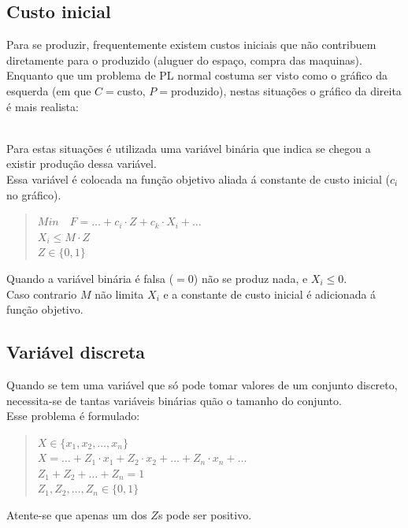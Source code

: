 \documentclass[]{report}
\begin{document}
\subsection{Custo inicial}
Para se produzir, frequentemente existem custos iniciais que não contribuem diretamente para o produzido (aluguer do espaço, compra das maquinas).\\
Enquanto que um problema de PL normal costuma ser visto como o gráfico da esquerda (em que $C=$custo, $P=$produzido), nestas situações o gráfico da direita é mais realista:\\
\\
Para estas situações é utilizada uma variável binária que indica se chegou a existir produção dessa variável.\\
Essa variável é colocada na função objetivo aliada á constante de custo inicial ($c_i$ no gráfico).
\begin{quotation}
\noindent $Min\quad F= \dots + c_i \cdot Z + c_k \cdot X_i + \dots$\\
$X_i \leq M \cdot Z$\\
$Z \in \{0,1\}$
\end{quotation}
Quando a variável binária é falsa ($=0$) não se produz nada, e $X_i \leq 0$.\\
Caso contrario $M$ não limita $X_i$ e a constante de custo inicial é adicionada á função objetivo.
\subsection{Variável discreta}
Quando se tem uma variável que só pode tomar valores de um conjunto discreto, necessita-se de tantas variáveis binárias quão o tamanho do conjunto.\\
Esse problema é formulado:
\begin{quotation}
\noindent
$X \in \{x_1, x_2, \dots, x_n\}$\\
$X=\dots + Z_1\cdot x_1 + Z_2 \cdot x_2 + \dots + Z_n \cdot x_n + \dots$\\
$Z_1 + Z_2 + \dots + Z_n = 1$\\
$Z_1, Z_2, \dots, Z_n \in \{0,1\}$
\end{quotation}
Atente-se que apenas um dos $Z$s pode ser positivo.
\end{document}
